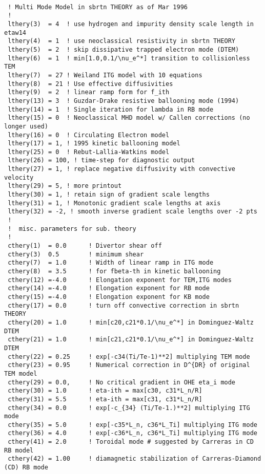                                \begin{verbatim}

 ! Multi Mode Model in sbrtn THEORY as of Mar 1996
 !
 lthery(3)  = 4  ! use hydrogen and impurity density scale length in etaw14
 lthery(4)  = 1  ! use neoclassical resistivity in sbrtn THEORY
 lthery(5)  = 2  ! skip dissipative trapped electron mode (DTEM)
 lthery(6)  = 1  ! min[1.0,0.1/\nu_e^*] transition to collisionless TEM
 lthery(7)  = 27 ! Weiland ITG model with 10 equations
 lthery(8)  = 21 ! Use effective diffusivities
 lthery(9)  = 2  ! linear ramp form for f_ith
 lthery(13) = 3  ! Guzdar-Drake resistive ballooning mode (1994)
 lthery(14) = 1  ! Single iteration for lambda in RB mode
 lthery(15) = 0  ! Neoclassical MHD model w/ Callen corrections (no longer used)
 lthery(16) = 0  ! Circulating Electron model
 lthery(17) = 1, ! 1995 kinetic ballooning model
 lthery(25) = 0  ! Rebut-Lallia-Watkins model
 lthery(26) = 100, ! time-step for diagnostic output
 lthery(27) = 1, ! replace negative diffusivity with convective velocity
 lthery(29) = 5, ! more printout
 lthery(30) = 1, ! retain sign of gradient scale lengths
 lthery(31) = 1, ! Monotonic gradient scale lengths at axis
 lthery(32) = -2, ! smooth inverse gradient scale lengths over -2 pts
 !
 !  misc. parameters for sub. theory
 !
 cthery(1)  = 0.0      ! Divertor shear off
 cthery(3)  0.5        ! minimum shear
 cthery(7)  = 1.0      ! Width of linear ramp in ITG mode
 cthery(8)  = 3.5      ! for fbeta-th in kinetic ballooning
 cthery(12) =-4.0      ! Elongation exponent for TEM,ITG modes
 cthery(14) =-4.0      ! Elongation exponent for RB mode
 cthery(15) =-4.0      ! Elongation exponent for KB mode
 cthery(17) = 0.0      ! turn off convective correction in sbrtn THEORY
 cthery(20) = 1.0      ! min[c20,c21*0.1/\nu_e^*] in Dominguez-Waltz DTEM
 cthery(21) = 1.0      ! min[c21,c21*0.1/\nu_e^*] in Dominguez-Waltz DTEM
 cthery(22) = 0.25     ! exp[-c34(Ti/Te-1)**2] multiplying TEM mode
 cthery(23) = 0.95     ! Numerical correction in D^{DR} of original TEM model
 cthery(29) = 0.0,     ! No critical gradient in OHE eta_i mode
 cthery(30) = 1.0      ! eta-ith = max[c30, c31*L_n/R]
 cthery(31) = 5.5      ! eta-ith = max[c31, c31*L_n/R]
 cthery(34) = 0.0      ! exp[-c_{34} (Ti/Te-1.)**2] multiplying ITG mode
 cthery(35) = 5.0      ! exp[-c35*L_n, c36*L_Ti] multiplying ITG mode
 cthery(36) = 4.0      ! exp[-c36*L_n, c36*L_Ti] multiplying ITG mode
 cthery(41) = 2.0      ! Toroidal mode # suggested by Carreras in CD RB model
 cthery(42) = 1.00     ! diamagnetic stabilization of Carreras-Diamond (CD) RB mode

\end{verbatim}
